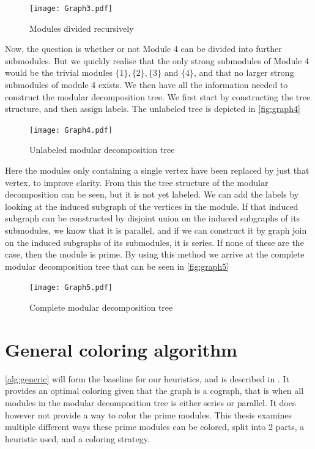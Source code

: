 \documentclass[a4paper]{article}
\begin{document}
\begin{figure}[H]
    \texttt{[image: Graph3.pdf]}
    \caption{Modules divided recursively}
    \label{fig:graph3}
\end{figure}

Now, the question is whether or not Module 4 can be divided into further
submodules. But we quickly realise that the only strong submodules of Module 4
would be the trivial modules $\{1\},\{2\},\{3\}$ and $\{4\}$, and that no larger strong submodules
of module 4 exists. We then have all the information needed to construct the
modular decomposition tree. We first start by constructing the tree structure,
and then assign labels. The unlabeled tree is depicted in \autoref{fig:graph4}

\begin{figure}[H]
    \texttt{[image: Graph4.pdf]}
    \caption{Unlabeled modular decomposition tree}
    \label{fig:graph4}
\end{figure}

Here the modules only containing a single vertex have been replaced by just that
vertex, to improve clarity. From this the tree structure of the modular
decomposition can be seen, but it is not yet labeled. We can add the labels by 
looking at the induced subgraph of the vertices in the module. If that induced
subgraph can be constructed by disjoint union on the induced subgraphs of its
submodules, we know that it is parallel, and if we can construct it by graph join on
the induced subgraphs of its submodules, it is series. If none of these are
the case, then the module is prime. By using this method we arrive at the complete
modular decomposition tree that can be seen in \autoref{fig:graph5}

\begin{figure}[h!]
    \texttt{[image: Graph5.pdf]}
    \caption{Complete modular decomposition tree}
    \label{fig:graph5}
\end{figure}

\FloatBarrier

\section{General coloring algorithm}
\label{sec:generic}

\autoref{alg:generic} will form the baseline for our heuristics, and is described in
\cite{HCL}. It provides an optimal coloring given that the graph is a cograph,
that is when all modules in the modular decomposition tree is either series or
parallel.  It does however not provide a way to color the prime modules. This
thesis examines multiple different ways these prime modules can be colored, split
into 2 parts, a heuristic used, and a coloring strategy. 
\end{document}
